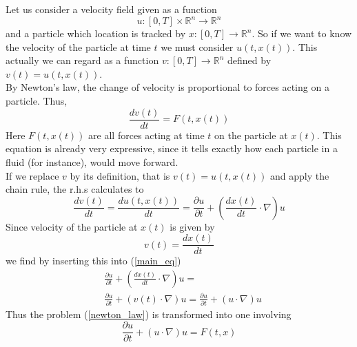 \documentclass[17pt]{extarticle}
\begin{document}
	Let us consider a velocity field given as a function 
	$$
	u:[0,T]\times\mathbb{R}^n\rightarrow\mathbb{R}^n
	$$
	and a particle which location is tracked by $x:[0,T]\rightarrow\mathbb{R}^n$.
	So if we want to know the velocity of the particle at time $t$ we must consider $u(t, x(t))$. This actually we can regard as a function $v:[0,T]\rightarrow\mathbb{R}^n$ defined by $v(t)=u(t, x(t))$.\\
	By Newton's law, the change of velocity is proportional to forces acting on a particle. Thus,
	\begin{equation} \label{newton_law}
	\frac{d v(t)}{dt}=F(t,x(t))
	\end{equation}
	Here $F(t, x(t))$ are all forces acting at time $t$ on the particle at $x(t)$.
	This equation is already very expressive, since it tells exactly how each particle in a fluid (for instance), would move forward.\\
	If we replace $v$ by its definition, that is $v(t)=u(t, x(t))$ and apply the chain rule, the r.h.s calculates to
	\begin{equation} \label{main_eq}
	\frac{d v(t)}{dt}=\frac{d u(t, x(t))}{dt}=\frac{\partial u}{\partial t}+
	\left(\frac{d x(t)}{dt}\cdot \nabla \right)u
	\end{equation}
	Since velocity of the particle at $x(t)$ is given by
	$$
	v(t)=\frac{d x(t)}{dt}
	$$
	we find by inserting this into (\ref{main_eq})
	\begin{align*}
	&	\frac{\partial u}{\partial t}+
		\left(\frac{d x(t)}{dt}\cdot \nabla \right)u=\\
	&\frac{\partial u}{\partial t}+
	\left(v(t)\cdot \nabla \right)u=\frac{\partial u}{\partial t}+
	\left(u\cdot \nabla \right)u
	\end{align*}
	Thus the problem (\ref{newton_law}) is transformed into one involving
	$$
	\frac{\partial u}{\partial t}+
	\left(u\cdot \nabla \right)u=F(t,x)
	$$	
\end{document}
